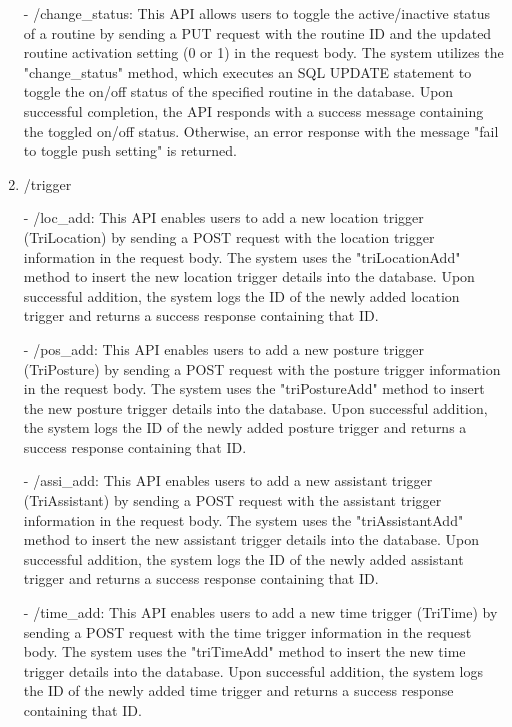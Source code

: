 \begin{enumerate}
                        \item[-] /change\_status: This API allows users to toggle the active/inactive status of a routine by sending a PUT request with the routine ID and the updated routine activation setting (0 or 1) in the request body. The system utilizes the "change\_status" method, which executes an SQL UPDATE statement to toggle the on/off status of the specified routine in the database. Upon successful completion, the API responds with a success message containing the toggled on/off status. Otherwise, an error response with the message "fail to toggle push setting" is returned.\\

                        \item /trigger
                        \item[-] /loc\_add: This API enables users to add a new location trigger (TriLocation) by sending a POST request with the location trigger information in the request body. The system uses the "triLocationAdd" method to insert the new location trigger details into the database. Upon successful addition, the system logs the ID of the newly added location trigger and returns a success response containing that ID.\\
                        \item[-] /pos\_add: This API enables users to add a new posture trigger (TriPosture) by sending a POST request with the posture trigger information in the request body. The system uses the "triPostureAdd" method to insert the new posture trigger details into the database. Upon successful addition, the system logs the ID of the newly added posture trigger and returns a success response containing that ID.\\
                        \item[-] /assi\_add: This API enables users to add a new assistant trigger (TriAssistant) by sending a POST request with the assistant trigger information in the request body. The system uses the "triAssistantAdd" method to insert the new assistant trigger details into the database. Upon successful addition, the system logs the ID of the newly added assistant trigger and returns a success response containing that ID.\\
                        \item[-] /time\_add: This API enables users to add a new time trigger (TriTime) by sending a POST request with the time trigger information in the request body. The system uses the "triTimeAdd" method to insert the new time trigger details into the database. Upon successful addition, the system logs the ID of the newly added time trigger and returns a success response containing that ID.\\

\end{enumerate}

